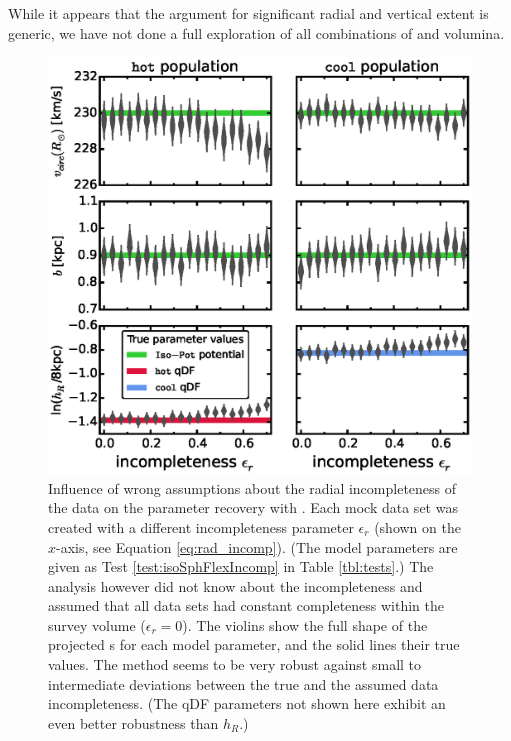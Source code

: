 While it appears that the argument for significant radial and vertical extent is generic, we have not done a full exploration of all combinations of \pmodel{} and volumina.




\begin{figure}[!htbp]
\centering
\includegraphics[width=\columnwidth]{figs/isoSphFlexIncompR_violins_2.eps}
\caption{Influence of wrong assumptions about the radial incompleteness of the data on the parameter recovery with \RM{}. Each mock data set was created with a different incompleteness parameter $\epsilon_r$ (shown on the $x$-axis, see Equation \ref{eq:rad_incomp}). (The model parameters are given as Test \ref{test:isoSphFlexIncomp} in Table \ref{tbl:tests}.) The analysis however did not know about the incompleteness and assumed that all data sets had constant completeness within the survey volume ($\epsilon_r = 0$). The violins show the full shape of the projected \pdf{}s for each model parameter, and the solid lines their true values. The \RM{} method seems to be very robust against small to intermediate deviations between the true and the assumed data incompleteness. (The qDF parameters not shown here exhibit an even better robustness than $h_R$.) \Wilma{[TO DO: $\text{km s}^{-1}$]}} 
\label{fig:isoSphFlexIncompR_violins}
\end{figure}

